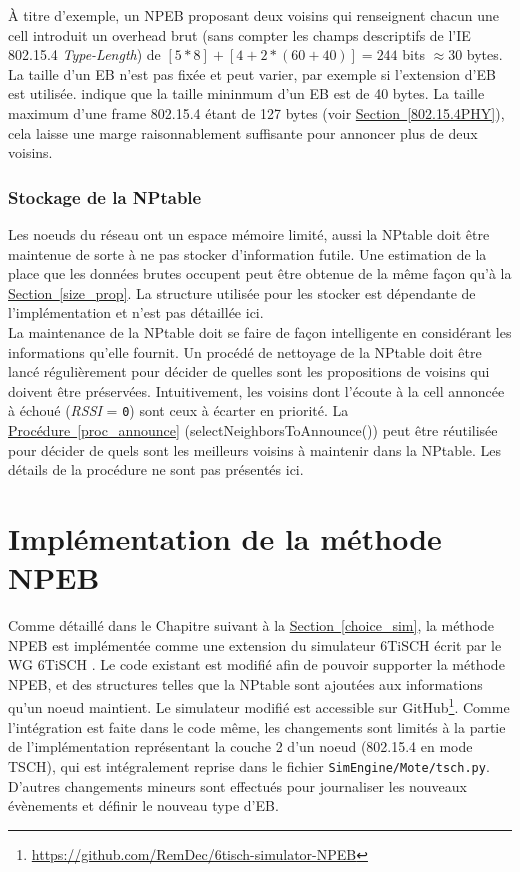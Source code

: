 \documentclass[]{report}
\newcommand{\wordlink}[2]{\hyperref[#2]{#1~\ref{#2}}}
\begin{document}
À titre d'exemple, un NPEB proposant deux voisins qui renseignent chacun une cell introduit un overhead brut (sans compter les champs descriptifs de l'IE 802.15.4 \textit{Type-Length}) de $[5*8] + [4+2*(60+40)] = 244$ bits $\approx 30$ bytes. La taille d'un EB n'est pas fixée et peut varier, par exemple si l'extension d'EB \cite{ietf-6tisch-enrollment-enhanced-beacon-14} est utilisée. \cite{ATP} indique que la taille mininmum d'un EB est de 40 bytes. La taille maximum d'une frame 802.15.4 étant de 127 bytes (voir \wordlink{Section}{802.15.4PHY}), cela laisse une marge raisonnablement suffisante pour annoncer plus de deux voisins.

\newpage

\subsubsection{Stockage de la NPtable}

Les noeuds du réseau ont un espace mémoire limité, aussi la NPtable doit être maintenue de sorte à ne pas stocker d'information futile. Une estimation de la place que les données brutes occupent peut être obtenue de la même façon qu'à la \wordlink{Section}{size_prop}. La structure utilisée pour les stocker est dépendante de l'implémentation et n'est pas détaillée ici.\\

La maintenance de la NPtable doit se faire de façon intelligente en considérant les informations qu'elle fournit. Un procédé de nettoyage de la NPtable doit être lancé régulièrement pour décider de quelles sont les propositions de voisins qui doivent être préservées. Intuitivement, les voisins dont l'écoute à la cell annoncée à échoué (\textit{RSSI} = \texttt{0}) sont ceux à écarter en priorité. La \wordlink{Procédure}{proc_announce} (selectNeighborsToAnnounce()) peut être réutilisée pour décider de quels sont les meilleurs voisins à maintenir dans la NPtable. Les détails de la procédure ne sont pas présentés ici.


\section{Implémentation de la méthode NPEB}

Comme détaillé dans le Chapitre suivant à la \wordlink{Section}{choice_sim}, la méthode NPEB est implémentée comme une extension du simulateur 6TiSCH écrit par le WG 6TiSCH \cite{simulating-6TiSCH}. Le code existant est modifié afin de pouvoir supporter la méthode NPEB, et des structures telles que la NPtable sont ajoutées aux informations qu'un noeud maintient. Le simulateur modifié est accessible sur GitHub\footnote{\url{https://github.com/RemDec/6tisch-simulator-NPEB}}. Comme l'intégration est faite dans le code même, les changements sont limités à la partie de l'implémentation représentant la couche 2 d'un noeud (802.15.4 en mode TSCH), qui est intégralement reprise dans le fichier \texttt{SimEngine/Mote/tsch.py}. D'autres changements mineurs sont effectués pour journaliser les nouveaux évènements et définir le nouveau type d'EB.\\
\end{document}
